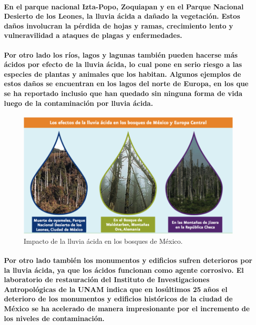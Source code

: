     \paragraph {En el parque nacional Izta-Popo, Zoquiapan y en el Parque Nacional Desierto de los Leones, la lluvia ácida a dañado la vegetación. Estos daños involucran la pérdida de hojas y ramas, crecimiento lento y vulneravilidad a ataques de plagas y enfermedades.}
    
    \paragraph {Por otro lado los ríos, lagos y lagunas también pueden hacerse más ácidos por efecto de la lluvia ácida, lo cual pone en serio riesgo a las especies de plantas y animales que los habitan. Algunos ejemplos de estos daños se encuentran en los lagos del norte de Europa, en los que se ha reportado inclusio que han quedado sin ninguna forma de vida luego de la contaminación por lluvia ácida.}

	\begin{figure}[h!]
	  	\centering
  	      \includegraphics[width=\textwidth]{./images/2.png}		  
  	    \caption{Impacto de la lluvia ácida en los bosques de México.}
	\end{figure}    
    
    \paragraph {Por otro lado también los monumentos y edificios sufren deterioros por la lluvia ácida, ya que los ácidos funcionan como agente corrosivo. El laboratorio de restauración del Instituto de Investigaciones Antropológicas de la UNAM indica que en losúltimos 25 años el deterioro de los monumentos y edificios históricos de la ciudad de México se ha acelerado de manera impresionante por el incremento de los niveles de contaminación.}

